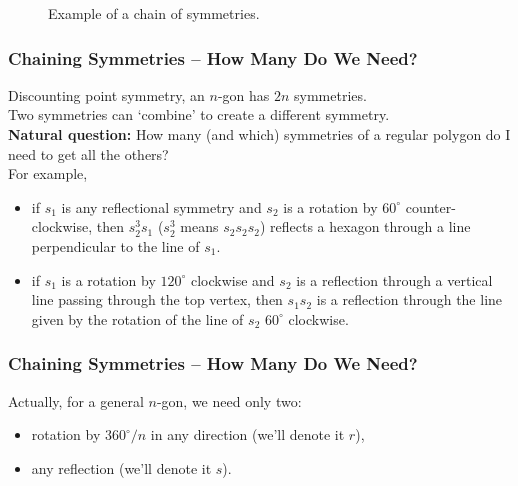 \documentclass[aspectratio=169,11pt,svgnames]{beamer}
\begin{document}
\begin{frame}
\begin{figure}[H]
\begin{subfigure}[b]{\textwidth}
  \end{subfigure}
  \caption*{Example of a chain of symmetries.}
 \end{figure}
\end{frame}

\begin{frame}
 \frametitle{Chaining Symmetries -- How Many Do We Need?}
 Discounting point symmetry, an $n$-gon has \alert{$2n$} symmetries.\\
 \pause
 Two symmetries can `combine' to create a different symmetry.\\
 \pause
 \textbf{Natural question:} How many (and which) symmetries of a regular polygon
  do I need to get all the others?\\
  \pause
  For example,
  \begin{itemize}[label=\textbullet,topsep=0pt]
   \item if $s_1$ is any reflectional symmetry and $s_2$ is a rotation by $60^{
    \circ }$ counter-clockwise, then $s_2^3s_1$ ($s_2^3$ means $s_2s_2s_2$)
    reflects a hexagon through a line perpendicular to the line of $s_1$.
   \pause
   \item if $s_1$ is a rotation by $120^{ \circ }$ clockwise and $s_2$ is a
    reflection through a vertical line passing through the top vertex, then
    $s_1s_2$ is a reflection through the line given by the rotation of the line
    of $s_2$ $60^{ \circ }$ clockwise.
  \end{itemize}
\end{frame}

\begin{frame}
 \frametitle{Chaining Symmetries -- How Many Do We Need?}
 Actually, for a general $n$-gon, we need only \alert{two}:
 \pause
 \begin{itemize}[label=\textbullet,topsep=0pt]
  \item rotation by $360^{ \circ } / n$ in any direction (we'll denote it $r$),
  \pause
  \item any reflection (we'll denote it $s$).
 \end{itemize}
\end{frame}
\end{document}
